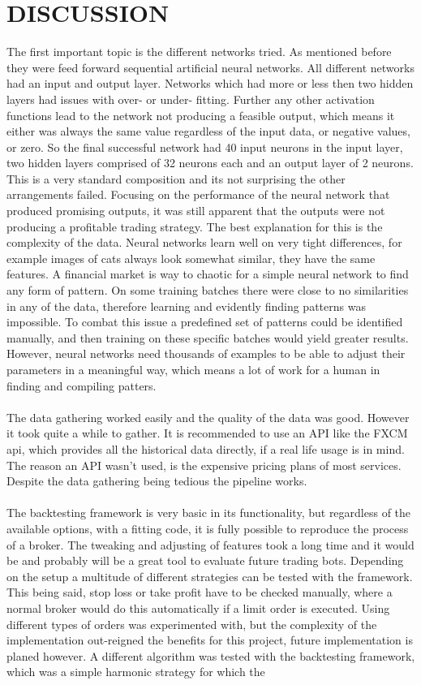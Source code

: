 \documentclass{article}
\begin{document}
\section{DISCUSSION}
The first important topic is the different networks tried. As mentioned before they were feed forward sequential artificial neural networks. All different networks had an input and output layer. Networks which had more or less then two hidden layers had issues with over- or under- fitting. Further any other activation functions lead to the network not producing a feasible output, which means it either was always the same value regardless of the input data, or negative values, or zero. So the final successful network had 40 input neurons in the input layer, two hidden layers comprised of 32 neurons each and an output layer of 2 neurons. This is a very standard composition and its not surprising the other arrangements failed. Focusing on the performance of the neural network that produced promising outputs, it was still apparent that the outputs were not producing a profitable trading strategy. The best explanation for this is the complexity of the data. Neural networks learn well on very tight differences, for example images of cats always look somewhat similar, they have the same features. A financial market is way to chaotic for a simple neural network to find any form of pattern. On some training batches there were close to no similarities in any of the data, therefore learning and evidently finding patterns was impossible. To combat this issue a predefined set of patterns could be identified manually, and then training on these specific batches would yield greater results. However, neural networks need thousands of examples to be able to adjust their parameters in a meaningful way, which means a lot of work for a human in finding and compiling patters. \\~\\ The data gathering worked easily and the quality of the data was good. However it took quite a while to gather. It is recommended to use an API like the FXCM api, which provides all the historical data directly, if a real life usage is in mind. The reason an API wasn't used, is the expensive pricing plans of most services. Despite the data gathering being tedious the pipeline works.\\~\\ The backtesting framework is very basic in its functionality, but regardless of the available options, with a fitting code, it is fully possible to reproduce the process of a broker. The tweaking and adjusting of features took a long time and it would be and probably will be a great tool to evaluate future trading bots. Depending on the setup a multitude of different strategies can be tested with the framework. This being said, stop loss or take profit have to be checked manually, where a normal broker would do this automatically if a limit order is executed. Using different types of orders was experimented with, but the complexity of the implementation out-reigned the benefits for this project, future implementation is planed however. A different algorithm was tested with the backtesting framework, which was a simple harmonic strategy for which the 
\end{document}
